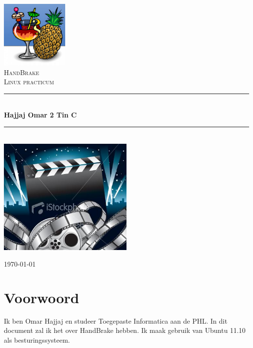 \documentclass[12pt,a4paper]{article}
\newcommand{\HRule}{\rule{\linewidth}{0.5mm}}
\begin{document}
\begin{titlepage}

\begin{center}



\includegraphics[width=0.25\textwidth]{./handbrake.png}\\[1cm]    

\textsc{\LARGE HandBrake}\\[1.5cm]

\textsc{\Large Linux practicum}\\[0.5cm]



\HRule \\[0.4cm]
{ \huge \bfseries Hajjaj Omar 2 Tin C}\\[0.3cm]

\HRule \\[1.5cm]
\includegraphics[width=0.5\textwidth]{./movie.png}\\[1cm]

\vfill


{\large \today}

\pagebreak
\tableofcontents
\listoffigures
\listoftables

\section{Voorwoord}
Ik ben Omar Hajjaj en studeer Toegepaste Informatica aan de PHL.
In dit document zal ik het over HandBrake hebben. Ik maak gebruik van  Ubuntu 11.10 als besturingssysteem.


\end{center}
\end{titlepage}
\end{document}
